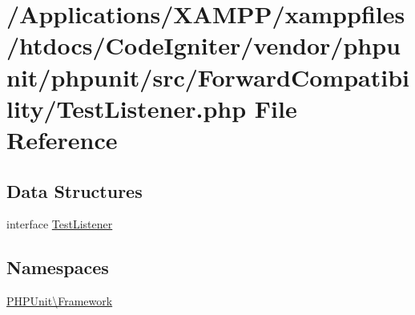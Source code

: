 \hypertarget{_forward_compatibility_2_test_listener_8php}{}\section{/\+Applications/\+X\+A\+M\+P\+P/xamppfiles/htdocs/\+Code\+Igniter/vendor/phpunit/phpunit/src/\+Forward\+Compatibility/\+Test\+Listener.php File Reference}
\label{_forward_compatibility_2_test_listener_8php}
\subsection*{Data Structures}
\begin{DoxyCompactItemize}
\item 
interface \mbox{\hyperlink{interface_p_h_p_unit_1_1_framework_1_1_test_listener}{Test\+Listener}}
\end{DoxyCompactItemize}
\subsection*{Namespaces}
\begin{DoxyCompactItemize}
\item 
 \mbox{\hyperlink{namespace_p_h_p_unit_1_1_framework}{P\+H\+P\+Unit\textbackslash{}\+Framework}}
\end{DoxyCompactItemize}

